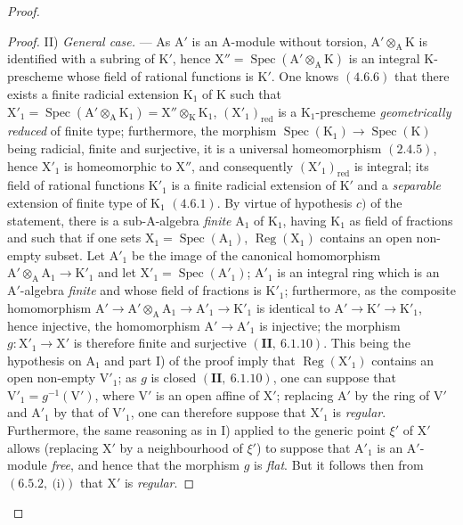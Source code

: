 \begin{proof}
\begin{proof}
II) \emph{General case.} --- As $\mathrm{A}'$ is an $\mathrm{A}$-module without torsion, $\mathrm{A}'\otimes_\mathrm{A}\mathrm{K}$ is identified with a
subring of $\mathrm{K}'$, hence $\mathrm{X}''=\operatorname{Spec}(\mathrm{A}'\otimes_\mathrm{A}\mathrm{K})$ is an integral $\mathrm{K}$-prescheme whose field of
rational functions is $\mathrm{K}'$. One knows $(4.6.6)$ that there exists a finite radicial extension
$\mathrm{K}_1$ of $\mathrm{K}$ such that $\mathrm{X}'_1=\operatorname{Spec}(\mathrm{A}'\otimes_\mathrm{A}\mathrm{K}_1)=\mathrm{X}''\otimes_\mathrm{K}\mathrm{K}_1$, $(\mathrm{X}'_1)_{\mathrm{red}}$ is a $\mathrm{K}_1$-prescheme \emph{geometrically
reduced} of finite type; furthermore, the morphism $\operatorname{Spec}(\mathrm{K}_1)\to\operatorname{Spec}(\mathrm{K})$ being radicial,
finite and surjective, it is a universal homeomorphism $(2.4.5)$, hence $\mathrm{X}'_1$ is homeomorphic
to $\mathrm{X}''$, and consequently $(\mathrm{X}'_1)_{\mathrm{red}}$ is integral; its field of rational functions $\mathrm{K}'_1$
is a finite radicial extension of $\mathrm{K}'$ and a \emph{separable} extension of finite type of $\mathrm{K}_1$ $(4.6.1)$.
By virtue of hypothesis $c)$ of the statement, there is a sub-$\mathrm{A}$-algebra \emph{finite} $\mathrm{A}_1$ of $\mathrm{K}_1$, having $\mathrm{K}_1$
as field of fractions and such that if one sets $\mathrm{X}_1=\operatorname{Spec}(\mathrm{A}_1)$, $\operatorname{Reg}(\mathrm{X}_1)$ contains an
open non-empty subset. Let $\mathrm{A}'_1$ be the image of the canonical homomorphism $\mathrm{A}'\otimes_\mathrm{A}\mathrm{A}_1\to\mathrm{K}'_1$
and let $\mathrm{X}'_1=\operatorname{Spec}(\mathrm{A}'_1)$; $\mathrm{A}'_1$ is an integral ring which is an $\mathrm{A}'$-algebra \emph{finite} and whose
field of fractions is $\mathrm{K}'_1$; furthermore, as the composite homomorphism
$\mathrm{A}'\to\mathrm{A}'\otimes_\mathrm{A}\mathrm{A}_1\to\mathrm{A}'_1\to\mathrm{K}'_1$ is identical to $\mathrm{A}'\to\mathrm{K}'\to\mathrm{K}'_1$, hence injective, the homomorphism
$\mathrm{A}'\to\mathrm{A}'_1$ is injective; the morphism $g:\mathrm{X}'_1\to\mathrm{X}'$ is therefore finite and surjective $(\mathbf{II},~6.1.10)$.
This being the hypothesis on $\mathrm{A}_1$ and part I) of the proof imply that $\operatorname{Reg}(\mathrm{X}'_1)$
contains an open non-empty $\mathrm{V}'_1$; as $g$ is closed $(\mathbf{II},~6.1.10)$, one can suppose
that $\mathrm{V}'_1=g^{-1}(\mathrm{V}')$, where $\mathrm{V}'$ is an open affine of $\mathrm{X}'$; replacing $\mathrm{A}'$ by the ring of $\mathrm{V}'$
and $\mathrm{A}'_1$ by that of $\mathrm{V}'_1$, one can therefore suppose that $\mathrm{X}'_1$ is \emph{regular}. Furthermore, the same
reasoning as in I) applied to the generic point $\xi'$ of $\mathrm{X}'$ allows (replacing $\mathrm{X}'$
by a neighbourhood of $\xi'$) to suppose that $\mathrm{A}'_1$ is an $\mathrm{A}'$-module \emph{free}, and hence
that the morphism $g$ is \emph{flat}. But it follows then from $(6.5.2,~\text{(i)})$ that $\mathrm{X}'$ is \emph{regular}.
\end{proof}


\end{proof}
